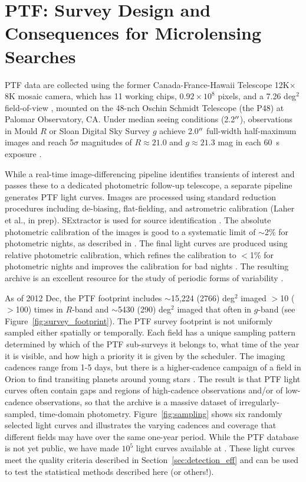 \documentclass{emulateapj}
\begin{document}
\section{PTF: Survey Design and Consequences for Microlensing Searches}\label{sec:ptf} 
PTF data are collected using the former Canada-France-Hawaii Telescope 12K$\times$8K mosaic camera, which has 11 working chips, $0.92\times10^8$ pixels, and a 7.26 deg$^2$ field-of-view \citep{rahmer2008}, mounted on the 48-nch Oschin Schmidt Telescope (the P48) at Palomar Observatory, CA. Under median seeing conditions (2.2$\mbox{$^{\prime\prime}$}$), observations in Mould $R$ or Sloan Digital Sky Survey \citep[SDSS;][]{york00} $g$ achieve 2.0$\mbox{$^{\prime\prime}$}$ full-width half-maximum images and reach 5$\sigma$ magnitudes of $R \approx 21.0$ and $g \approx 21.3$ mag in each 60~s exposure \citep{nick2009,rau2009,nick2010}. 

While a real-time image-differencing pipeline identifies transients of interest and passes these to a dedicated photometric follow-up telescope, a separate pipeline generates PTF light curves. Images are processed using standard reduction procedures including de-biasing, flat-fielding, and astrometric calibration (Laher et al., in prep). SExtractor is used for source identification \citep{bertin96}. The absolute photometric calibration of the images is good to a systematic limit of $\sim$2\% for photometric nights, as described in \cite{ofek2012}.  The final light curves are produced using relative photometric calibration, which refines the calibration to $<$1\% for photometric nights and improves the calibration for bad nights \citep[Levitan et al., in prep; for algorithm details see][]{levitan2011, ofek2012}. The resulting archive is an excellent resource for the study of periodic forms of variability \citep[e.g., stellar or asteroid rotation;][]{agueros11,polishook2012}. 

As of 2012 Dec, the PTF footprint includes $\sim$15,224 (2766) deg$^2$ imaged $>$10 ($>$100) times in $R$-band and $\sim$5430 (290) deg$^2$ imaged that often in $g$-band (see Figure~\ref{fig:survey_footprint}). The PTF survey footprint is not uniformly sampled either spatially or temporally. Each field has a unique sampling pattern determined by which of the PTF sub-surveys it belongs to, what time of the year it is visible, and how high a priority it is given by the scheduler. The imaging cadences range from 1-5 days, but there is a higher-cadence campaign of a field in Orion to find transiting planets around young stars \citep{nick2009}. The result is that PTF light curves often contain gaps and regions of high-cadence observations and/or of low-cadence observations, so that the archive is a massive dataset of irregularly-sampled, time-domain photometry. Figure~\ref{fig:sampling} shows six randomly selected light curves and illustrates the varying cadences and coverage that different fields may have over the same one-year period. While the PTF database is not yet public, we have made $10^5$ light curves available at {\tt }. These light curves meet the quality criteria described in Section~\ref{sec:detection_eff} and can be used to test the statistical methods described here (or others!).
\end{document}
